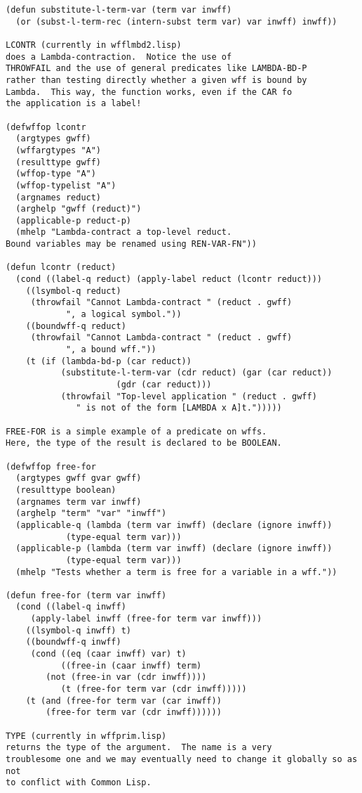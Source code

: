 \begin{verbatim}
(defun substitute-l-term-var (term var inwff)
  (or (subst-l-term-rec (intern-subst term var) var inwff) inwff))

LCONTR (currently in wfflmbd2.lisp)
does a Lambda-contraction.  Notice the use of
THROWFAIL and the use of general predicates like LAMBDA-BD-P
rather than testing directly whether a given wff is bound by
Lambda.  This way, the function works, even if the CAR fo
the application is a label!

(defwffop lcontr
  (argtypes gwff)
  (wffargtypes "A")
  (resulttype gwff)
  (wffop-type "A")
  (wffop-typelist "A")
  (argnames reduct)
  (arghelp "gwff (reduct)")
  (applicable-p reduct-p)
  (mhelp "Lambda-contract a top-level reduct.
Bound variables may be renamed using REN-VAR-FN"))

(defun lcontr (reduct)
  (cond ((label-q reduct) (apply-label reduct (lcontr reduct)))
	((lsymbol-q reduct)
	 (throwfail "Cannot Lambda-contract " (reduct . gwff)
		    ", a logical symbol."))
	((boundwff-q reduct)
	 (throwfail "Cannot Lambda-contract " (reduct . gwff)
		    ", a bound wff."))
	(t (if (lambda-bd-p (car reduct))
	       (substitute-l-term-var (cdr reduct) (gar (car reduct))
				      (gdr (car reduct)))
	       (throwfail "Top-level application " (reduct . gwff)
			  " is not of the form [LAMBDA x A]t.")))))

FREE-FOR is a simple example of a predicate on wffs.
Here, the type of the result is declared to be BOOLEAN.

(defwffop free-for
  (argtypes gwff gvar gwff)
  (resulttype boolean)
  (argnames term var inwff)
  (arghelp "term" "var" "inwff")
  (applicable-q (lambda (term var inwff) (declare (ignore inwff))
			(type-equal term var)))
  (applicable-p (lambda (term var inwff) (declare (ignore inwff))
			(type-equal term var)))
  (mhelp "Tests whether a term is free for a variable in a wff."))

(defun free-for (term var inwff)
  (cond ((label-q inwff)
	 (apply-label inwff (free-for term var inwff)))
  	((lsymbol-q inwff) t)
	((boundwff-q inwff)
	 (cond ((eq (caar inwff) var) t)
	       ((free-in (caar inwff) term)
		(not (free-in var (cdr inwff))))
	       (t (free-for term var (cdr inwff)))))
	(t (and (free-for term var (car inwff))
		(free-for term var (cdr inwff))))))

TYPE (currently in wffprim.lisp) 
returns the type of the argument.  The name is a very
troublesome one and we may eventually need to change it globally so as not
to conflict with Common Lisp.


\end{verbatim}
